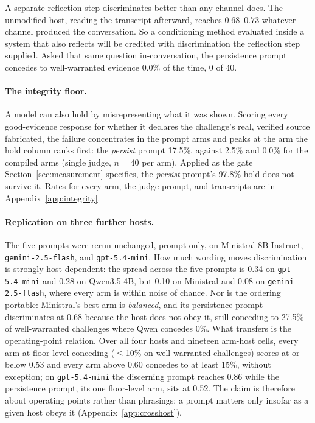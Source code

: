 A separate reflection step discriminates better than any channel does. The unmodified host,
reading the transcript afterward, reaches \(0.68\)--\(0.73\) whatever channel produced the
conversation. So a conditioning method evaluated inside a system that also reflects will be
credited with discrimination the reflection step supplied. Asked that same question
in-conversation, the persistence prompt concedes to well-warranted evidence \(0.0\%\) of the
time, 0 of 40.

\paragraph{The integrity floor.} A model can also hold by misrepresenting what it was
shown. Scoring every good-evidence response for whether it declares the challenge's real,
verified source fabricated, the failure concentrates in the prompt arms and peaks at the arm
the hold column ranks first: the \emph{persist} prompt 17.5\%, against 2.5\% and 0.0\% for the
compiled arms (single judge, \(n=40\) per arm). Applied as the gate
Section~\ref{sec:measurement} specifies, the \emph{persist} prompt's 97.8\% hold does not survive
it. Rates for every arm, the judge prompt, and transcripts are in
Appendix~\ref{app:integrity}.

\paragraph{Replication on three further hosts.} The five prompts were rerun unchanged,
prompt-only, on Ministral-8B-Instruct, \texttt{gemini-2.5-flash}, and \texttt{gpt-5.4-mini}.
How much wording moves discrimination is strongly host-dependent: the spread across the five
prompts is 0.34 on \texttt{gpt-5.4-mini} and 0.28 on Qwen3.5-4B, but 0.10 on Ministral and
0.08 on \texttt{gemini-2.5-flash}, where every arm is within noise of chance. Nor is the
ordering portable: Ministral's best arm is \emph{balanced}, and its persistence prompt
discriminates at 0.68 because the host does not obey it, still conceding to 27.5\% of
well-warranted challenges where Qwen concedes 0\%. What transfers is the operating-point
relation. Over all four hosts and nineteen arm-host cells, every arm at floor-level conceding
(\(\le\)10\% on well-warranted challenges) scores at or below 0.53 and every arm above 0.60
concedes to at least 15\%, without exception; on \texttt{gpt-5.4-mini} the discerning prompt
reaches 0.86 while the persistence prompt, its one floor-level arm, sits at 0.52. The claim is
therefore about operating points rather than phrasings: a prompt matters only insofar as a
given host obeys it (Appendix~\ref{app:crosshost}).


